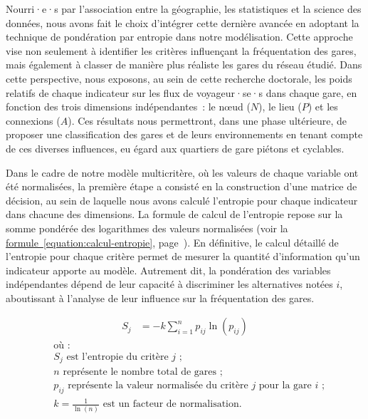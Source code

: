 \begin{refsegment}
Nourri·e·s par l'association entre la géographie, les statistiques et la science des données, nous avons fait le choix d'intégrer cette dernière avancée en adoptant la technique de pondération par entropie dans notre modélisation. Cette approche vise non seulement à identifier les critères influençant la fréquentation des gares, mais également à classer de manière plus réaliste les gares du réseau étudié. Dans cette perspective, nous exposons, au sein de cette recherche doctorale, les poids relatifs de chaque indicateur sur les flux de voyageur·se·s dans chaque gare, en fonction des trois dimensions indépendantes~: le nœud (\(N\)), le lieu (\(P\)) et les connexions (\(A\)). Ces résultats nous permettront, dans une phase ultérieure, de proposer une classification des gares et de leurs environnements en tenant compte de ces diverses influences, eu égard aux quartiers de gare piétons et cyclables.%

Dans le cadre de notre modèle multicritère, où les valeurs de chaque variable ont été normalisées, la première étape a consisté en la construction d'une matrice de décision, au sein de laquelle nous avons calculé l'entropie pour chaque indicateur dans chacune des dimensions. La formule de calcul de l'entropie repose sur la somme pondérée des logarithmes des valeurs normalisées (voir la \hyperref[equation:calcul-entropie]{formule~\ref{equation:calcul-entropie}}, page~\pageref{equation:calcul-entropie}). En définitive, le calcul détaillé de l'entropie pour chaque critère permet de mesurer la quantité d'information qu'un indicateur apporte au modèle. Autrement dit, la pondération des variables indépendantes dépend de leur capacité à discriminer les alternatives notées \(i\), aboutissant à l'analyse de leur influence sur la fréquentation des gares.%

\begin{equation}
\label{equation:calcul-entropie}
\begin{aligned}
S_j &= -k \sum\limits_{i=1}^{n} p_{ij} \ln(p_{ij})
\end{aligned}
\end{equation}
\begin{align*}
    &\text{où~:} \\
    &S_j \text{~est l'entropie du critère } j\text{~;}\\
    &n \text{~représente le nombre total de gares~;}\\
    &p_{ij} \text{~représente la valeur normalisée du critère } j 
            \text{ pour la gare } i\text{~;}\\
    &k = \frac{1}{\ln(n)} \text{~est un facteur de normalisation.}
\end{align*}%


\end{refsegment}
